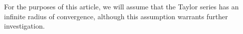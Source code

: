 For the purposes of this article, we will assume that the Taylor series has an infinite radius of convergence, although this assumption warrants further investigation.%


